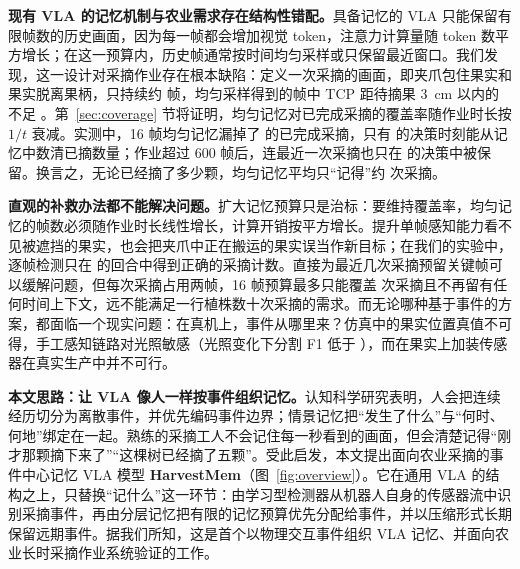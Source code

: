 \textbf{现有 VLA 的记忆机制与农业需求存在结构性错配。}具备记忆的 VLA 只能保留有限帧数的历史画面，因为每一帧都会增加视觉 token，注意力计算量随 token 数平方增长\cite{vaswani2017attention}；在这一预算内，历史帧通常按时间均匀采样或只保留最近窗口。我们发现，这一设计对采摘作业存在根本缺陷：定义一次采摘的画面，即夹爪包住果实和果实脱离果柄，只持续约  帧，均匀采样得到的帧中 TCP 距待摘果 3~cm 以内的不足 。第~\ref{sec:coverage} 节将证明，均匀记忆对已完成采摘的覆盖率随作业时长按 $1/t$ 衰减。实测中，16 帧均匀记忆漏掉了  的已完成采摘，只有  的决策时刻能从记忆中数清已摘数量；作业超过 600 帧后，连最近一次采摘也只在  的决策中被保留。换言之，无论已经摘了多少颗，均匀记忆平均只“记得”约  次采摘。

\textbf{直观的补救办法都不能解决问题。}扩大记忆预算只是治标：要维持覆盖率，均匀记忆的帧数必须随作业时长线性增长，计算开销按平方增长。提升单帧感知能力看不见被遮挡的果实，也会把夹爪中正在搬运的果实误当作新目标；在我们的实验中，逐帧检测只在  的回合中得到正确的采摘计数。直接为最近几次采摘预留关键帧可以缓解问题，但每次采摘占用两帧，16 帧预算最多只能覆盖  次采摘且不再留有任何时间上下文，远不能满足一行植株数十次采摘的需求。而无论哪种基于事件的方案，都面临一个现实问题：在真机上，事件从哪里来？仿真中的果实位置真值不可得，手工感知链路对光照敏感（光照变化下分割 F1 低于 ），而在果实上加装传感器在真实生产中并不可行。

\textbf{本文思路：让 VLA 像人一样按事件组织记忆。}认知科学研究表明，人会把连续经历切分为离散事件，并优先编码事件边界\cite{zacks2007event}；情景记忆把“发生了什么”与“何时、何地”绑定在一起\cite{tulving1972episodic,clayton1998episodic}。熟练的采摘工人不会记住每一秒看到的画面，但会清楚记得“刚才那颗摘下来了”“这棵树已经摘了五颗”。受此启发，本文提出面向农业采摘的事件中心记忆 VLA 模型 \textbf{HarvestMem}（图~\ref{fig:overview}）。它在通用 VLA 的结构之上，只替换“记什么”这一环节：由学习型检测器从机器人自身的传感器流中识别采摘事件，再由分层记忆把有限的记忆预算优先分配给事件，并以压缩形式长期保留远期事件。据我们所知，这是首个以物理交互事件组织 VLA 记忆、并面向农业长时采摘作业系统验证的工作。

